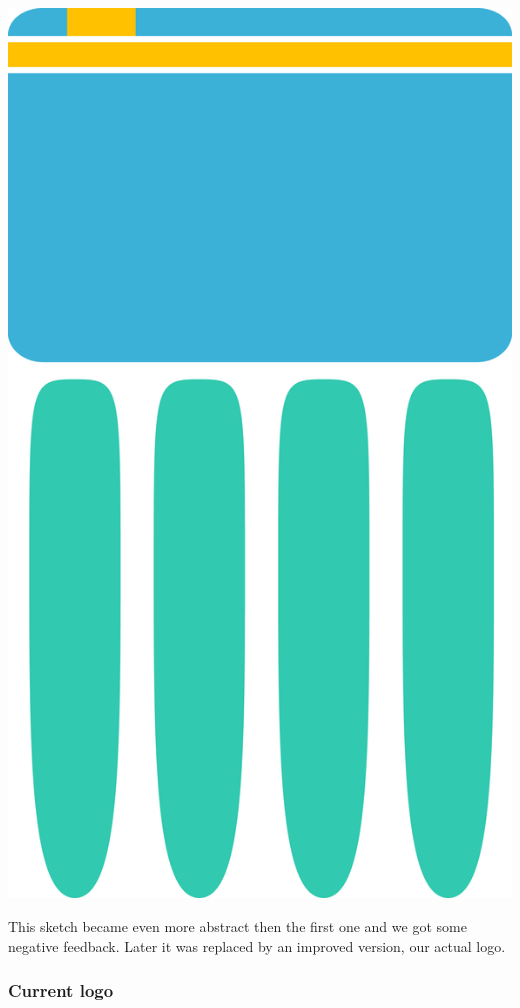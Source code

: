 \begin{center}
\includegraphics[scale=0.30]{images/logo_v02.png}
\end{center}

This sketch became even more abstract then the first one and we got some negative feedback. Later it was replaced by an improved version, our actual logo.

\subsubsection{Current logo}

